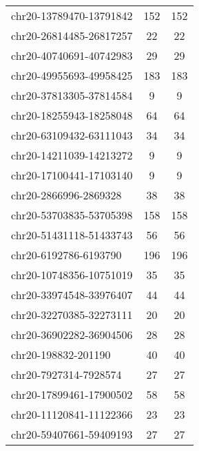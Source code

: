 \begin{longtable}{lSS}
	chr20-13789470-13791842 & 152    & 152                                       \\
	chr20-26814485-26817257 & 22     & 22                                        \\
	chr20-40740691-40742983 & 29     & 29                                        \\
	chr20-49955693-49958425 & 183    & 183                                       \\
	chr20-37813305-37814584 & 9      & 9                                         \\
	chr20-18255943-18258048 & 64     & 64                                        \\
	chr20-63109432-63111043 & 34     & 34                                        \\
	chr20-14211039-14213272 & 9      & 9                                         \\
	chr20-17100441-17103140 & 9      & 9                                         \\
	chr20-2866996-2869328   & 38     & 38                                        \\
	chr20-53703835-53705398 & 158    & 158                                       \\
	chr20-51431118-51433743 & 56     & 56                                        \\
	chr20-6192786-6193790   & 196    & 196                                       \\
	chr20-10748356-10751019 & 35     & 35                                        \\
	chr20-33974548-33976407 & 44     & 44                                        \\
	chr20-32270385-32273111 & 20     & 20                                        \\
	chr20-36902282-36904506 & 28     & 28                                        \\
	chr20-198832-201190     & 40     & 40                                        \\
	chr20-7927314-7928574   & 27     & 27                                        \\
	chr20-17899461-17900502 & 58     & 58                                        \\
	chr20-11120841-11122366 & 23     & 23                                        \\
	chr20-59407661-59409193 & 27     & 27                                        \\

\end{longtable}
